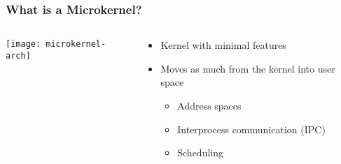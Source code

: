 \begin{frame}[plain]
	\frametitle{What is a Microkernel?}
	
	
	
	\begin{columns}
		
		\begin{column}{.4\textwidth}
			
			\texttt{[image: microkernel-arch]}
			
		\end{column}
		
		\begin{column}{.6\textwidth}
			
		\begin{itemize}
		\item Kernel with minimal features
		\item Moves as much from the kernel into user space
			\begin{itemize}
				\item Address spaces
				\item Interprocess communication (IPC)
		 		\item Scheduling

		 	
			\end{itemize}	
		\end{itemize}	
		\end{column}
		
		
	\end{columns}
	
\end{frame}


